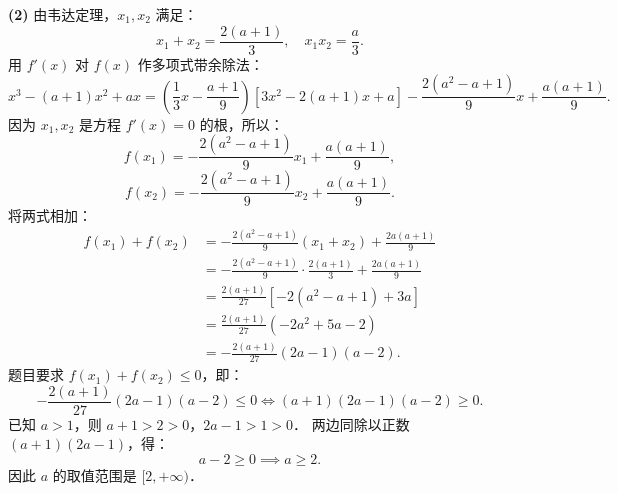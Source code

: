 \begin{answer}
\textbf{(2)}
由韦达定理，$x_1, x_2$ 满足：
\nopagebreak[4]
\[
x_1 + x_2 = \frac{2(a + 1)}{3}, \quad x_1 x_2 = \frac{a}{3}.
\]
用 $f'(x)$ 对 $f(x)$ 作多项式带余除法：
\nopagebreak[4]
\[
x^3 - (a + 1)x^2 + ax = \left(\frac{1}{3}x - \frac{a + 1}{9}\right)[3x^2 - 2(a + 1)x + a] - \frac{2(a^2 - a + 1)}{9}x + \frac{a(a + 1)}{9}.
\]
因为 $x_1, x_2$ 是方程 $f'(x) = 0$ 的根，所以：
\nopagebreak[4]
\[
f(x_1) = -\frac{2(a^2 - a + 1)}{9}x_1 + \frac{a(a + 1)}{9},
\]
\nopagebreak[4]
\[
f(x_2) = -\frac{2(a^2 - a + 1)}{9}x_2 + \frac{a(a + 1)}{9}.
\]
将两式相加：
\nopagebreak[4]
\[
\begin{aligned}
f(x_1) + f(x_2) &= -\frac{2(a^2 - a + 1)}{9}(x_1 + x_2) + \frac{2a(a + 1)}{9} \\
&= -\frac{2(a^2 - a + 1)}{9} \cdot \frac{2(a + 1)}{3} + \frac{2a(a + 1)}{9} \\
&= \frac{2(a + 1)}{27}\left[-2(a^2 - a + 1) + 3a\right] \\
&= \frac{2(a + 1)}{27}(-2a^2 + 5a - 2) \\
&= -\frac{2(a + 1)}{27}(2a - 1)(a - 2).
\end{aligned}
\]
题目要求 $f(x_1) + f(x_2) \leqslant 0$，即：
\nopagebreak[4]
\[
-\frac{2(a + 1)}{27}(2a - 1)(a - 2) \leqslant 0 \iff (a + 1)(2a - 1)(a - 2) \geqslant 0.
\]
已知 $a > 1$，则 $a + 1 > 2 > 0$，$2a - 1 > 1 > 0$．
两边同除以正数 $(a + 1)(2a - 1)$，得：
\nopagebreak[4]
\[
a - 2 \geqslant 0 \implies a \geqslant 2.
\]
因此 $a$ 的取值范围是 $[2, +\infty)$．


\gkanswer{答案（2）：$[2, +\infty)$。}

\end{answer}
